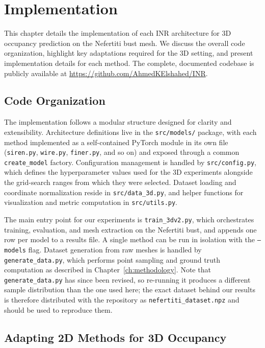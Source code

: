 \chapter{Implementation}
\label{ch:implementation}

This chapter details the implementation of each INR architecture for 3D occupancy prediction on the Nefertiti bust mesh. We discuss the overall code organization, highlight key adaptations required for the 3D setting, and present implementation details for each method. The complete, documented codebase is publicly available at \url{https://github.com/AhmedKElshahed/INR}.

\section{Code Organization}

The implementation follows a modular structure designed for clarity and extensibility. Architecture definitions live in the \texttt{src/models/} package, with each method implemented as a self-contained PyTorch module in its own file (\texttt{siren.py}, \texttt{wire.py}, \texttt{finer.py}, and so on) and exposed through a common \texttt{create\_model} factory. Configuration management is handled by \texttt{src/config.py}, which defines the hyperparameter values used for the 3D experiments alongside the grid-search ranges from which they were selected. Dataset loading and coordinate normalization reside in \texttt{src/data\_3d.py}, and helper functions for visualization and metric computation in \texttt{src/utils.py}.

The main entry point for our experiments is \texttt{train\_3dv2.py}, which orchestrates training, evaluation, and mesh extraction on the Nefertiti bust, and appends one row per model to a results file. A single method can be run in isolation with the \texttt{--models} flag. Dataset generation from raw meshes is handled by \texttt{generate\_data.py}, which performs point sampling and ground truth computation as described in Chapter~\ref{ch:methodology}. Note that \texttt{generate\_data.py} has since been revised, so re-running it produces a different sample distribution than the one used here; the exact dataset behind our results is therefore distributed with the repository as \texttt{nefertiti\_dataset.npz} and should be used to reproduce them.

\section{Adapting 2D Methods for 3D Occupancy}

